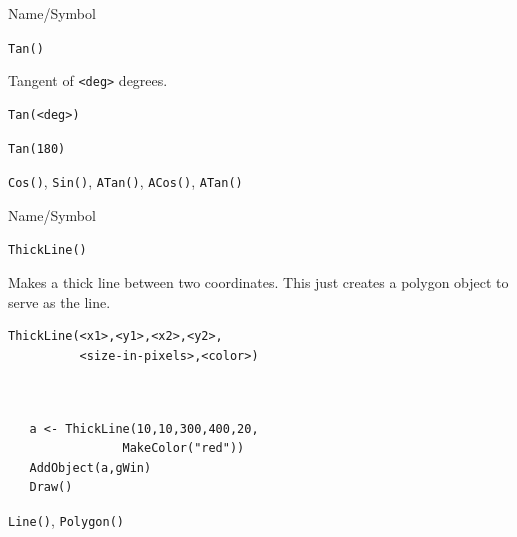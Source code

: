 \begin{desc}{Name/Symbol}
\item[Name/Symbol]  	\verb+Tan()+	

\item[Description] 	Tangent of \verb+<deg>+ degrees.

\item[Usage]       	
\begin{verbatim}
Tan(<deg>)
\end{verbatim}

\item[Example]
\begin{verbatim}
Tan(180)
\end{verbatim}

\item[See Also]    	\verb+Cos()+, \verb+Sin()+, \verb+ATan()+, \verb+ACos()+, \verb+ATan()+ 
\end{desc}



\begin{desc}{Name/Symbol}
\item[Name/Symbol]  	\verb+ThickLine()+	

\item[Description] 	Makes a thick line between two coordinates. This just creates
  a polygon object to serve as the line.

\item[Usage]       	
\begin{verbatim}
ThickLine(<x1>,<y1>,<x2>,<y2>,
          <size-in-pixels>,<color>)
\end{verbatim}

\item[Example]
\begin{verbatim}
   

   a <- ThickLine(10,10,300,400,20,
                MakeColor("red"))
   AddObject(a,gWin)
   Draw()

\end{verbatim}

\item[See Also]  \verb+Line()+, \verb+Polygon()+
\end{desc}



